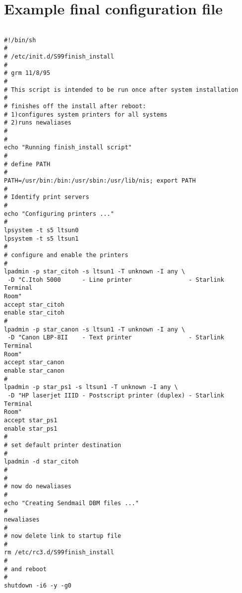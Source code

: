 \newpage

\section{Example final configuration file}
\label{app:config}

\begin{small}
\begin{verbatim}

#!/bin/sh
#
# /etc/init.d/S99finish_install
#
# grm 11/8/95
#
# This script is intended to be run once after system installation
#
# finishes off the install after reboot:
# 1)configures system printers for all systems
# 2)runs newaliases
#
#
echo "Running finish_install script"
#
# define PATH
#
PATH=/usr/bin:/bin:/usr/sbin:/usr/lib/nis; export PATH
#
# Identify print servers
#
echo "Configuring printers ..."
#
lpsystem -t s5 ltsun0
lpsystem -t s5 ltsun1
#
# configure and enable the printers
#
lpadmin -p star_citoh -s ltsun1 -T unknown -I any \
 -D "C.Itoh 5000      - Line printer                - Starlink Terminal
Room"
accept star_citoh
enable star_citoh
#
lpadmin -p star_canon -s ltsun1 -T unknown -I any \
 -D "Canon LBP-8II    - Text printer                - Starlink Terminal
Room"
accept star_canon
enable star_canon
#
lpadmin -p star_ps1 -s ltsun1 -T unknown -I any \
 -D "HP laserjet IIID - Postscript printer (duplex) - Starlink Terminal
Room"
accept star_ps1
enable star_ps1
#
# set default printer destination
#
lpadmin -d star_citoh
#
#
# now do newaliases
#
echo "Creating Sendmail DBM files ..."
#
newaliases
#
# now delete link to startup file
#
rm /etc/rc3.d/S99finish_install
#
# and reboot
#
shutdown -i6 -y -g0

\end{verbatim}
\end{small}


